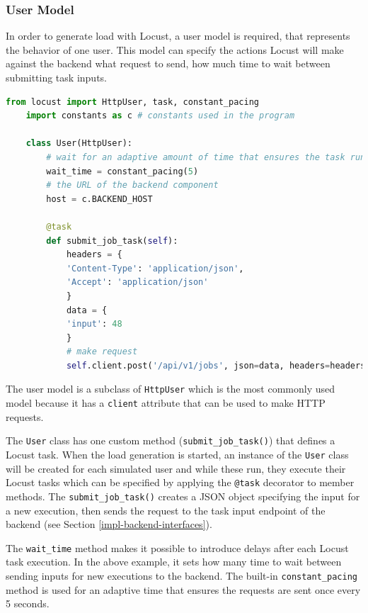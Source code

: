 \subsubsection{User Model}

In order to generate load with Locust, a user model is required, that represents the behavior of one user. This model can specify the actions Locust will make against the backend \eg what request to send, how much time to wait between submitting task inputs.

\vspace{0.5cm}
\begin{minipage}{\linewidth}
	\begin{lstlisting}[language=python, caption={Locust user model}, label={lst:locust-user}]
	from locust import HttpUser, task, constant_pacing
	import constants as c # constants used in the program
	
	class User(HttpUser):
		# wait for an adaptive amount of time that ensures the task runs (at most) once every X seconds
		wait_time = constant_pacing(5)
		# the URL of the backend component
		host = c.BACKEND_HOST
		
		@task
		def submit_job_task(self):
			headers = {
			'Content-Type': 'application/json',
			'Accept': 'application/json'
			}
			data = {
			'input': 48
			}
			# make request
			self.client.post('/api/v1/jobs', json=data, headers=headers)
	\end{lstlisting}
\end{minipage}

The user model is a subclass of \texttt{HttpUser} which is the most commonly used model because it has a \texttt{client} attribute that can be used to make HTTP requests.

The \texttt{User} class has one custom method (\texttt{submit\_job\_task()}) that defines a Locust task. When the load generation is started, an instance of the \texttt{User} class will be created for each simulated user and while these run, they execute their Locust tasks which can be specified \eg by applying the \texttt{@task} decorator to member methods. The \texttt{submit\_job\_task()} creates a JSON object specifying the input for a new execution, then sends the request to the task input endpoint of the backend (see Section \ref{impl-backend-interfaces}).

The \texttt{wait\_time} method makes it possible to introduce delays after each Locust task execution. In the above example, it sets how many time to wait between sending inputs for new executions to the backend. The built-in \texttt{constant\_pacing} method is used for an adaptive time that ensures the requests are sent once every 5 seconds.

